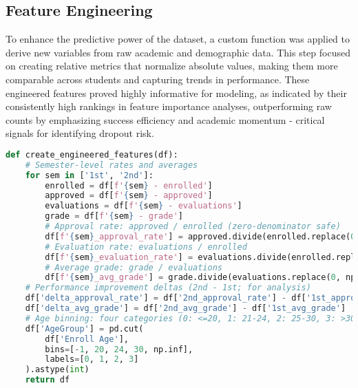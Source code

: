 \documentclass[twoside,final]{hcmut-report}
\begin{document}
\subsection{Feature Engineering}
To enhance the predictive power of the dataset, a custom function was applied to derive new variables from raw academic and demographic data. This step focused on creating relative metrics that normalize absolute values, making them more comparable across students and capturing trends in performance. These engineered features proved highly informative for modeling, as indicated by their consistently high rankings in feature importance analyses, outperforming raw counts by emphasizing success efficiency and academic momentum - critical signals for identifying dropout risk.
\begin{lstlisting}[language=python]
def create_engineered_features(df):
    # Semester-level rates and averages
    for sem in ['1st', '2nd']:
        enrolled = df[f'{sem} - enrolled']
        approved = df[f'{sem} - approved']
        evaluations = df[f'{sem} - evaluations']
        grade = df[f'{sem} - grade']
        # Approval rate: approved / enrolled (zero-denominator safe)
        df[f'{sem}_approval_rate'] = approved.divide(enrolled.replace(0, np.nan)).fillna(0)
        # Evaluation rate: evaluations / enrolled
        df[f'{sem}_evaluation_rate'] = evaluations.divide(enrolled.replace(0, np.nan)).fillna(0)
        # Average grade: grade / evaluations
        df[f'{sem}_avg_grade'] = grade.divide(evaluations.replace(0, np.nan)).fillna(0)
    # Performance improvement deltas (2nd - 1st; for analysis)
    df['delta_approval_rate'] = df['2nd_approval_rate'] - df['1st_approval_rate']
    df['delta_avg_grade'] = df['2nd_avg_grade'] - df['1st_avg_grade']
    # Age binning: four categories (0: <=20, 1: 21-24, 2: 25-30, 3: >30)
    df['AgeGroup'] = pd.cut(
        df['Enroll Age'],
        bins=[-1, 20, 24, 30, np.inf],
        labels=[0, 1, 2, 3]
    ).astype(int)
    return df
\end{lstlisting}
\end{document}
